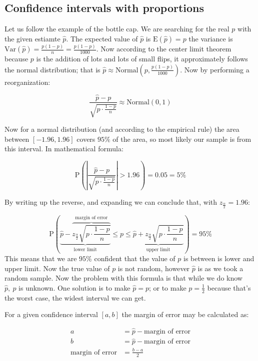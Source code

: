 \subsection{Confidence intervals with proportions}

Let us follow the example of the bottle cap. We are searching for the real $p$
with the given estiamte $\hat{p}$. The expected value of $\hat{p}$ is
$\mbox{E}(\hat{p})=p$ the variance is $\mbox{Var}(\hat{p}) =
\frac{p(1-p)}{n}=\frac{p(1-p)}{1000}$. Now according to the center limit theorem
because $p$ is the addition of lots and lots of small flips, it approximately
follows the normal distribution; that is $\hat{p} \approx
\mbox{Normal}\left(p, \frac{p(1-p)}{1000}\right)$. Now by performing a
reorganization: 

\[ \frac{\hat{p}-p}{\sqrt{p\cdot\frac{1-p}{n}}} \approx \mbox{Normal}(0,1) \]

Now for a normal distribution (and according to the empirical rule) the area
between $[-1.96, 1.96]$ covers $95\%$ of the area, so most likely our sample is
from this interval. In mathematical formula:


\[ \mbox{P} \left( \left| \frac{\hat{p}-p}{\sqrt{p\cdot\frac{1-p}{n}}} \right| >
1.96\right) = 0.05 = 5\%
\]

By writing up the reverse, and expanding we can conclude that, with
$z_{\frac{\alpha}{2}} = 1.96$:

\[ \mbox{P} \left( \underbrace{\hat{p} - \overbrace{z_{\frac{\alpha}{2}}\sqrt{p
\cdot \frac{1-p}{n}}}^{\mbox{margin of error}}}_{\mbox{lower limit}} \leq p \leq
\underbrace{\hat{p} + z_{\frac{\alpha}{2}}\sqrt{p \cdot
\frac{1-p}{n}}}_{\mbox{upper limit}} \right) = 95\%
\]
This means that we are $95\%$ confident that the value of $p$ is between is
lower and upper limit. Now the true value of $p$ is not random, however
$\hat{p}$ is as we took a random sample. Now the problem with this formula is
that while we do know $\hat{p},~p$ is unknown. One solution is to make
$\hat{p}=p$; or to make $p=\frac{1}{2}$ because that's the worst case, the
widest interval we can get.

For a given confidence interval $[a,b]$ the margin of error may be calculated
as:

\begin{align*}
a &= \hat{p} - \mbox{margin of error} \\
  b &= \hat{p} - \mbox{margin of error} \\ 
  \mbox{margin of error} &= \frac{b-a}{2}
\end{align*} 


